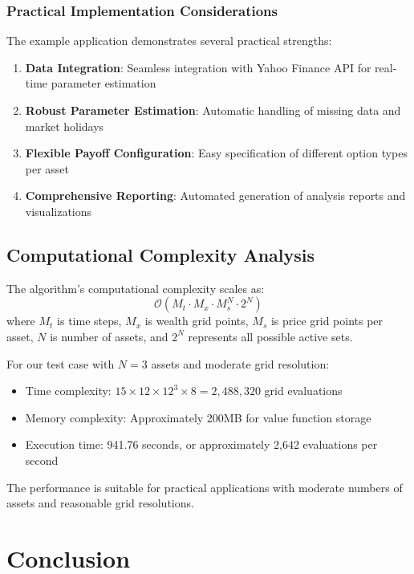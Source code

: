 \documentclass[11pt]{article}
\begin{document}
\subsubsection{Practical Implementation Considerations}
The example application demonstrates several practical strengths:

\begin{enumerate}
\item \textbf{Data Integration}: Seamless integration with Yahoo Finance API for real-time parameter estimation
\item \textbf{Robust Parameter Estimation}: Automatic handling of missing data and market holidays
\item \textbf{Flexible Payoff Configuration}: Easy specification of different option types per asset
\item \textbf{Comprehensive Reporting}: Automated generation of analysis reports and visualizations
\end{enumerate}

\subsection{Computational Complexity Analysis}

The algorithm's computational complexity scales as:
\begin{equation}
\mathcal{O}(M_t \cdot M_x \cdot M_s^N \cdot 2^N)
\end{equation}
where $M_t$ is time steps, $M_x$ is wealth grid points, $M_s$ is price grid points per asset, $N$ is number of assets, and $2^N$ represents all possible active sets.

For our test case with $N=3$ assets and moderate grid resolution:
\begin{itemize}
\item Time complexity: $15 \times 12 \times 12^3 \times 8 = 2,488,320$ grid evaluations
\item Memory complexity: Approximately 200MB for value function storage
\item Execution time: 941.76 seconds, or approximately 2,642 evaluations per second
\end{itemize}

The performance is suitable for practical applications with moderate numbers of assets and reasonable grid resolutions.

\section{Conclusion}
\end{document}
